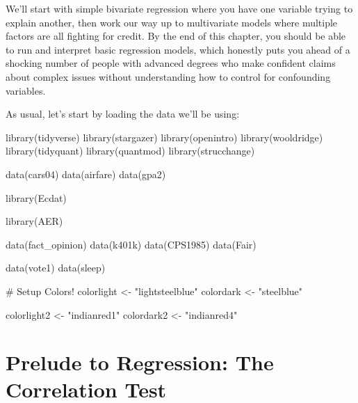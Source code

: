 \documentclass[
  letterpaper,
]{book}
\newenvironment{Shaded}{\begin{snugshade}}{\end{snugshade}}
\newcommand{\CommentTok}[1]{\textcolor[rgb]{0.37,0.37,0.37}{#1}}
\newcommand{\FunctionTok}[1]{\textcolor[rgb]{0.28,0.35,0.67}{#1}}
\newcommand{\NormalTok}[1]{\textcolor[rgb]{0.00,0.23,0.31}{#1}}
\newcommand{\OtherTok}[1]{\textcolor[rgb]{0.00,0.23,0.31}{#1}}
\newcommand{\StringTok}[1]{\textcolor[rgb]{0.13,0.47,0.30}{#1}}
\begin{document}
We'll start with simple bivariate regression where you have one variable
trying to explain another, then work our way up to multivariate models
where multiple factors are all fighting for credit. By the end of this
chapter, you should be able to run and interpret basic regression
models, which honestly puts you ahead of a shocking number of people
with advanced degrees who make confident claims about complex issues
without understanding how to control for confounding variables.

As usual, let's start by loading the data we'll be using:

\begin{Shaded}
\begin{Highlighting}[]
\FunctionTok{library}\NormalTok{(tidyverse)}
\FunctionTok{library}\NormalTok{(stargazer)}
\FunctionTok{library}\NormalTok{(openintro)}
\FunctionTok{library}\NormalTok{(wooldridge)}
\FunctionTok{library}\NormalTok{(tidyquant)}
\FunctionTok{library}\NormalTok{(quantmod)}
\FunctionTok{library}\NormalTok{(strucchange)}

\FunctionTok{data}\NormalTok{(cars04)}
\FunctionTok{data}\NormalTok{(airfare)}
\FunctionTok{data}\NormalTok{(gpa2)}



\FunctionTok{library}\NormalTok{(Ecdat)}

\FunctionTok{library}\NormalTok{(AER)}



\FunctionTok{data}\NormalTok{(fact\_opinion)}
\FunctionTok{data}\NormalTok{(k401k)}
\FunctionTok{data}\NormalTok{(CPS1985)}
\FunctionTok{data}\NormalTok{(Fair)}

\FunctionTok{data}\NormalTok{(vote1)}
\FunctionTok{data}\NormalTok{(sleep)}


\CommentTok{\# Setup Colors!}
\NormalTok{colorlight }\OtherTok{\textless{}{-}} \StringTok{"lightsteelblue"}
\NormalTok{colordark }\OtherTok{\textless{}{-}} \StringTok{"steelblue"}

\NormalTok{colorlight2 }\OtherTok{\textless{}{-}} \StringTok{"indianred1"}
\NormalTok{colordark2 }\OtherTok{\textless{}{-}} \StringTok{"indianred4"}
\end{Highlighting}
\end{Shaded}

\section{Prelude to Regression: The Correlation
Test}\label{prelude-to-regression-the-correlation-test}
\end{document}
